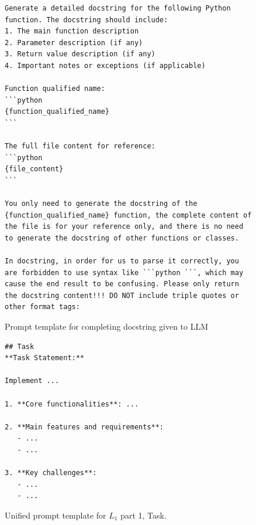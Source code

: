\documentclass{article}
\begin{document}
\begin{figure}[htbp]
\centering
\begin{tcolorbox}[
    colback=white,
    colframe=black!60,
    coltitle=white,
    colbacktitle=black!60,
    title=Prompt for completing docstring,
    fonttitle=\bfseries,
    boxrule=0.7pt,
    arc=1mm,
    width=1.\linewidth,
]
\begin{lstlisting}[basicstyle=\footnotesize\ttfamily, breaklines=true]
Generate a detailed docstring for the following Python function. The docstring should include:
1. The main function description
2. Parameter description (if any)
3. Return value description (if any)
4. Important notes or exceptions (if applicable)

Function qualified name:
```python
{function_qualified_name}
```

The full file content for reference:
```python
{file_content}
```

You only need to generate the docstring of the {function_qualified_name} function, the complete content of the file is for your reference only, and there is no need to generate the docstring of other functions or classes.

In docstring, in order for us to parse it correctly, you are forbidden to use syntax like ```python ```, which may cause the end result to be confusing. Please only return the docstring content!!! DO NOT include triple quotes or other format tags:
\end{lstlisting}
\end{tcolorbox}
\caption{Prompt template for completing docstring given to LLM}
\label{fig:llm-docstring}
\end{figure}

\begin{figure}[h]
\centering
\begin{tcolorbox}[
    colback=white,
    colframe=black!60,
    coltitle=white,
    colbacktitle=black!60,
    title=User prompt part 1 of 3 (Level 1),
    fonttitle=\bfseries,
    boxrule=0.7pt,
    arc=1mm,
    width=1.\linewidth,
]
\begin{lstlisting}[basicstyle=\footnotesize\ttfamily, breaklines=true]
## Task
**Task Statement:**

Implement ...

1. **Core functionalities**: ...

2. **Main features and requirements**: 
   - ...
   - ...

3. **Key challenges**: 
   - ...
   - ...

\end{lstlisting}
\end{tcolorbox}
\caption{Unified prompt template for $L_1$ part 1, Task.}
\label{fig:systemprompt1}
\end{figure}
\end{document}

